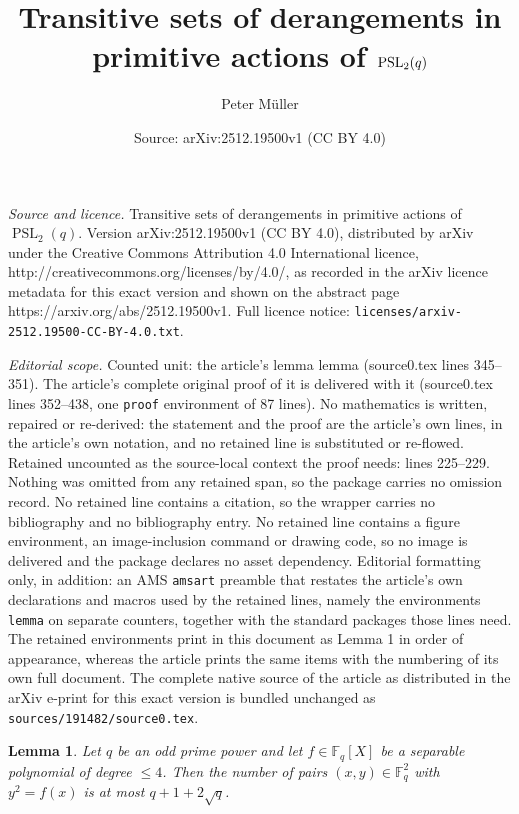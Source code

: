 \documentclass[10pt,a4paper]{amsart}
\title{Transitive sets of derangements in primitive actions of $\PSL_2(q)$}
\author{Peter M\"uller}
\date{Source: arXiv:2512.19500v1 (CC BY 4.0)}
\DeclareMathOperator{\PSL}{PSL}
\newtheorem{lemma}{Lemma}
\newcommand{\FF}{\mathbb F}
\begin{document}
\maketitle

\noindent\emph{Source and licence.} Transitive sets of derangements in primitive actions of $\PSL_2(q)$. Version arXiv:2512.19500v1 (CC BY 4.0), distributed by arXiv under the Creative Commons Attribution 4.0 International licence, http://creativecommons.org/licenses/by/4.0/, as recorded in the arXiv licence metadata for this exact version and shown on the abstract page https://arxiv.org/abs/2512.19500v1. Full licence notice: \texttt{licenses/arxiv-2512.19500-CC-BY-4.0.txt}.\par\smallskip

\noindent\textit{Editorial scope.} Counted unit: the article's lemma lemma (source0.tex lines 345--351). The article's complete original proof of it is delivered with it (source0.tex lines 352--438, one \texttt{proof} environment of 87 lines). No mathematics is written, repaired or re-derived: the statement and the proof are the article's own lines, in the article's own notation, and no retained line is substituted or re-flowed.  Retained uncounted as the source-local context the proof needs: lines 225--229.  Nothing was omitted from any retained span, so the package carries no omission record.  No retained line contains a citation, so the wrapper carries no bibliography and no bibliography entry.  No retained line contains a figure environment, an image-inclusion command or drawing code, so no image is delivered and the package declares no asset dependency.  Editorial formatting only, in addition: an AMS \texttt{amsart} preamble that restates the article's own declarations and macros used by the retained lines, namely the environments \texttt{lemma} on separate counters, together with the standard packages those lines need.  The retained environments print in this document as Lemma 1 in order of appearance, whereas the article prints the same items with the numbering of its own full document.  The complete native source of the article as distributed in the arXiv e-print for this exact version is bundled unchanged as \texttt{sources/191482/source0.tex}.
\begin{lemma}\label{l:hasse}
  Let $q$ be an odd prime power and let $f\in\FF_q[X]$ be a separable
  polynomial of degree $\le4$. Then the number of pairs
  $(x,y)\in\FF_q^2$ with $y^2=f(x)$ is at most $q+1+2\sqrt{q}$.
\end{lemma}
\end{document}
